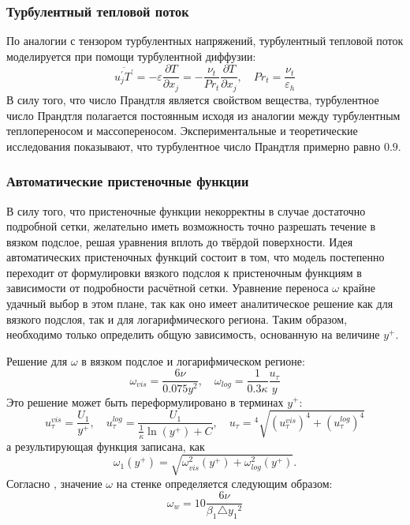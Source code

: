 \documentclass[pdftex,a4paper,12pt]{article}
\begin{document}
			\subsubsection{Турбулентный тепловой поток}
			По аналогии с тензором турбулентных напряжений, турбулентный тепловой поток моделируется при помощи турбулентной диффузии:
				\begin{equation}
					\overline{u^{'}_jT^{'}} = - \varepsilon \frac{\partial T}{\partial x_j} = -\frac{\nu_t}{Pr_t}\frac{\partial T}{\partial x_j}, \quad Pr_t = \frac{\nu_t}{\varepsilon_h}
				\end{equation}
				В силу того, что число Прандтля является свойством вещества, турбулентное число Прандтля полагается постоянным исходя из аналогии между турбулентным теплопереносом и массопереносом. Экспериментальные и теоретические исследования показывают, что турбулентное число Прандтля примерно равно $0.9$.
			\subsubsection{Автоматические пристеночные функции}
				В силу того, что пристеночные функции некорректны в случае достаточно подробной сетки, желательно иметь возможность точно разрешать течение в вязком подслое, решая уравнения вплоть до твёрдой поверхности. Идея автоматических пристеночных функций состоит в том, что модель постепенно переходит от формулировки вязкого подслоя к пристеночным функциям в зависимости от подробности расчётной сетки. Уравнение переноса $\omega$ крайне удачный выбор в этом плане, так как оно имеет аналитическое решение как для вязкого подслоя, так и для логарифмического региона. Таким образом, необходимо только определить общую зависимость, основанную на величине $y^{+}$.
				
				Решение для $\omega$ в вязком подслое и логарифмическом регионе:
				\begin{equation}
					\omega_{vis} = \frac{6\nu}{0.075 y^2}, \quad \omega_{log} = \frac{1}{0.3 \kappa}\frac{u_{\tau}}{y}
				\end{equation}
				Это решение может быть переформулировано в терминах $y^{+}$:
				\begin{equation}
						u_{\tau}^{vis} = \frac{U_1}{y^{+}}, \quad u_{\tau}^{log} = \frac{U_1}{\frac{1}{\kappa}\ln(y^{+})+C}, \quad u_{\tau} = {}^4\sqrt{(u_{\tau}^{vis})^4 + (u_{\tau}^{log})^4}
				\end{equation}
				а результирующая функция записана, как
				\begin{equation}
					\omega_1(y^{+})=\sqrt{\omega^2_{vis}(y^{+})+\omega^2_{log}(y^{+})}.
				\end{equation}
				Согласно \cite{Garbarek}, значение $\omega$ на стенке определяется следующим образом:
		\begin{equation}
			\omega_w = 10 \frac{6\nu}{\beta_1 \triangle{y_1}^2}
		\end{equation}
	\newpage
\end{document}
